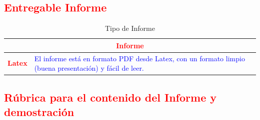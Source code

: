 \documentclass{article}
\begin{document}
	\subsection{\textcolor{red}{Entregable Informe}}
	\begin{table}[H]
		\caption{Tipo de Informe}
		\setlength{\tabcolsep}{0.5em}
		{\renewcommand{\arraystretch}{1.5}
		\begin{tabular}{|p{3cm}|p{12cm}|}
			\hline
			\multicolumn{2}{|c|}{\textbf{\textcolor{red}{Informe}}}  \\
			\hline 
			\textbf{\textcolor{red}{Latex}} & \textcolor{blue}{El informe está en formato PDF desde Latex, con un formato limpio (buena presentación) y fácil de leer.}   \\ 
			\hline 
		\end{tabular}
		}
	\end{table}

	\clearpage

	\subsection{\textcolor{red}{Rúbrica para el contenido del Informe y demostración}}
	
\end{document}
